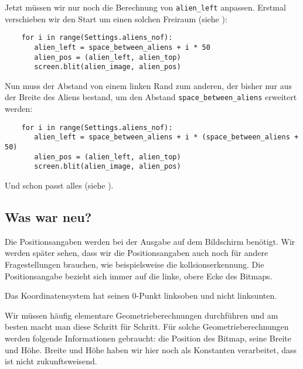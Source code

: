 Jetzt müssen wir nur noch die Berechnung von \texttt{alien\_left} anpassen. Erstmal verschieben wir den Start um einen solchen Freiraum (siehe ):

\lstset{firstnumber=43}
\begin{lstlisting}
	for i in range(Settings.aliens_nof):
	   alien_left = space_between_aliens + i * 50
	   alien_pos = (alien_left, alien_top)
	   screen.blit(alien_image, alien_pos)
\end{lstlisting}


Nun muss der Abstand von einem linken Rand zum anderen, der bisher nur aus der Breite des Aliens bestand, um den Abstand \texttt{space\_between\_aliens} erweitert werden:

\lstset{firstnumber=43}
\begin{lstlisting}
	for i in range(Settings.aliens_nof):
	   alien_left = space_between_aliens + i * (space_between_aliens + 50)
	   alien_pos = (alien_left, alien_top)
	   screen.blit(alien_image, alien_pos)
\end{lstlisting} 

Und schon passt alles (siehe ).



\subsection*{Was war neu?}

Die Positionsangaben werden bei der Ausgabe auf dem Bildschirm benötigt. Wir werden später sehen, dass wir die Positionsangaben auch noch für andere Fragestellungen brauchen, wie beispielsweise die \Gls{kollsionserkennung}. Die Positionsangabe bezieht sich immer auf die linke, obere Ecke des Bitmaps. 
	
Das Koordinatensystem hat seinen 0-Punkt linksoben und nicht linksunten.
	
Wir müssen häufig elementare Geometrieberechnungen durchführen und am besten macht man diese Schritt für Schritt. Für solche Geometrieberechnungen werden folgende Informationen gebraucht: die Position des Bitmap, seine Breite und Höhe. Breite und Höhe haben wir hier noch als Konstanten verarbeitet, dass ist nicht zukunftsweisend.


